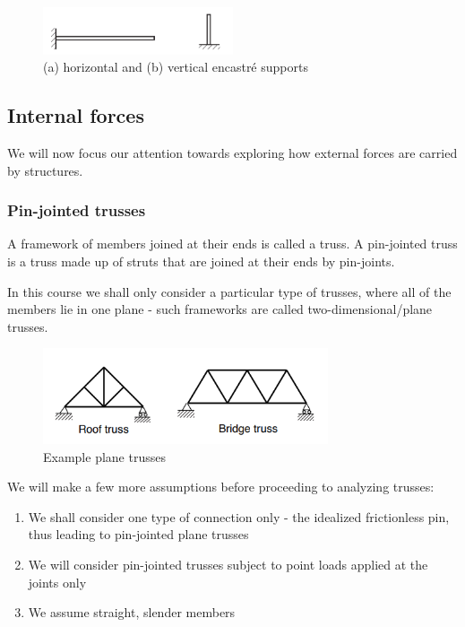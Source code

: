 \documentclass{article}
\begin{document}
\begin{figure}[h]
    \centering
    \includegraphics[width = 0.5\textwidth]{images/encastre.png}
    \caption{(a) horizontal and (b) vertical encastré supports}
    \label{fig:enter-label}
\end{figure}

\newpage

\subsection{Internal forces}

We will now focus our attention towards exploring how external forces are carried by structures.

\subsubsection{Pin-jointed trusses}

\begin{definition}
    A framework of members joined at their ends is called a truss. A pin-jointed truss is a truss made up of struts that are joined at their ends by pin-joints.
\end{definition}

In this course we shall only consider a particular type of trusses, where all of the members lie in one plane - such frameworks are called two-dimensional/plane trusses.

\begin{figure}[h]
    \centering
    \includegraphics[width = 0.75\textwidth]{images/trusses.png}
    \caption{Example plane trusses}
    \label{fig:enter-label}
\end{figure}

We will make a few more assumptions before proceeding to analyzing trusses:

\begin{enumerate}
    \item We shall consider one type of connection only - the idealized frictionless pin, thus leading to pin-jointed plane trusses
    \item We will consider pin-jointed trusses subject to point loads applied at the joints only
    \item We assume straight, slender members
\end{enumerate}
\end{document}
